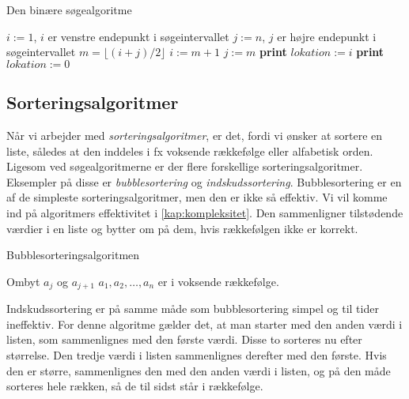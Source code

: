\begin{algorithm}[H]
\caption{Den binære søgealgoritme}
\begin{algorithmic}[1]

    \State $i:=1$, {$i$ er venstre endepunkt i søgeintervallet}
    \State $j:=n$, {$j$ er højre endepunkt i søgeintervallet}
        \State $m=\lfloor (i+j)/2 \rfloor$
    		\State $i:=m+1$
    		\Else
    		\State $j:=m$
    		\EndIf
    \State \textbf{print} $lokation:=i$
    \Else
    \State \textbf{print} $lokation:=0$
    \EndIf
    \EndWhile  \label{roy's loop}
\EndProcedure

\end{algorithmic}
\label{alg:binaer}
\end{algorithm}

\subsection{Sorteringsalgoritmer} \label{kap:sortering}
Når vi arbejder med \emph{sorteringsalgoritmer}, er det, fordi vi ønsker at sortere en liste, således at den inddeles i fx voksende rækkefølge eller alfabetisk orden. Ligesom ved søgealgoritmerne er der flere forskellige sorteringsalgoritmer. Eksempler på disse er \emph{bubblesortering} og \emph{indskudssortering}. Bubblesortering er en af de simpleste sorteringsalgoritmer, men den er ikke så effektiv. Vi vil komme ind på algoritmers effektivitet i \autoref{kap:kompleksitet}. Den sammenligner tilstødende værdier i en liste og bytter om på dem, hvis rækkefølgen ikke er korrekt.

\begin{algorithm}[H]
\caption{Bubblesorteringsalgoritmen}
\begin{algorithmic}[1]

\EndProcedure
{}
    			\State Ombyt $a_{j}$ og $a_{j+1}$ 	
\EndIf
\EndFor
\EndFor
\State $a_{1},a_{2},\dotsc,a_{n}$ er i voksende rækkefølge. 

\end{algorithmic}
\end{algorithm}



Indskudssortering er på samme måde som bubblesortering simpel og til tider ineffektiv. For denne algoritme gælder det, at man starter med den anden værdi i listen, som sammenlignes med den første værdi. Disse to sorteres nu efter størrelse. Den tredje værdi i listen sammenlignes derefter med den første. Hvis den er større, sammenlignes den med den anden værdi i listen, og på den måde sorteres hele rækken, så de til sidst står i rækkefølge.

